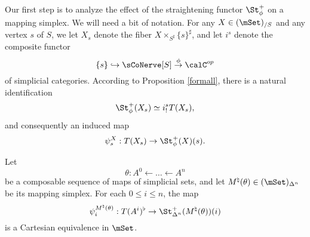 Our first step is to analyze the effect of the straightening functor $\St^{+}_{\phi}$ on a mapping simplex.
We will need a bit of notation. For any $X \in (\mSet)_{/S}$ and any vertex $s$ of $S$,
we let $X_{s}$ denote the fiber $X \times_{ S^{\sharp} } \{s\}^{\sharp}$, and let $i^{s}$
denote the composite functor
$$ \{s\} \hookrightarrow \sCoNerve[S] \stackrel{\phi}{\rightarrow} \calC^{op}$$
of simplicial categories. According to Proposition \ref{formall}, there is a natural identification
$$ \St^{+}_{\phi}(X_s) \simeq i^{s}_{!} T(X_s),$$ and consequently an induced map
$$ \psi^X_{s}: T(X_s) \rightarrow \St^{+}_{\phi}(X)(s).$$

\begin{lemma}\label{piecemeal}
Let $$\theta: A^0 \leftarrow \ldots \leftarrow A^n$$ 
be a composable sequence of maps of simplicial sets, and let
$M^{\natural}(\theta) \in (\mSet)_{\Delta^n}$ be its mapping simplex.
For each $0 \leq i \leq n$, the map
$$ \psi^{M^{\natural}(\theta)}_{i}: T(A^i)^{\flat} \rightarrow \St^{+}_{\Delta^n}(M^{\natural}(\theta))(i) $$  
is a Cartesian equivalence in $\mSet$.
\end{lemma}

